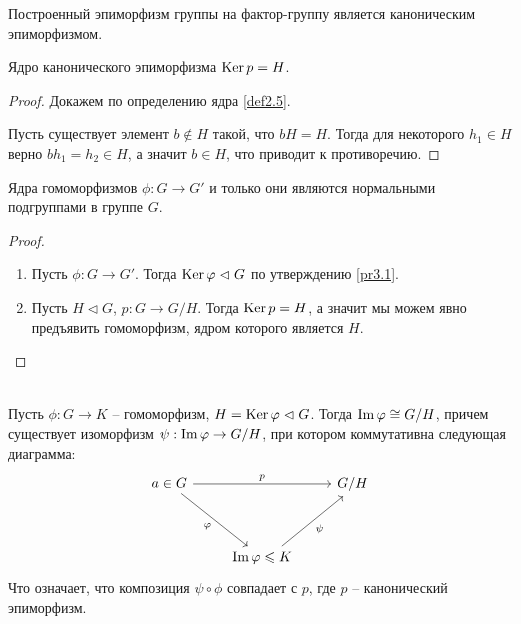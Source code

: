 \begin{definition}
    Построенный эпиморфизм группы на фактор-группу является каноническим эпиморфизмом.
\end{definition}

\begin{note}
    \label{note2.1}
    Ядро канонического эпиморфизма $\operatorname{Ker} p = H$.
\end{note}

\begin{proof}
    Докажем по определению ядра \ref{def2.5}.

    Пусть существует элемент $b \not\in H$ такой, что $bH = H$. Тогда для некоторого $h_1 \in H$ 
    верно $bh_1 = h_2 \in H$, а значит $b \in H$, что приводит к противоречию.
\end{proof}

\begin{corollary}
    Ядра гомоморфизмов $\phi: G \to G'$ и только они являются нормальными подгруппами в группе $G$.
\end{corollary}

\begin{proof}~
    \begin{enumerate}
        \item Пусть $\phi: G \to G'$. Тогда $\operatorname{Ker} \varphi \vartriangleleft G$ по утверждению \ref{pr3.1}.
        \item Пусть $H \vartriangleleft G$, $p: G \to G/H$. Тогда $\operatorname{Ker} p = H$, а значит мы можем 
        явно предъявить гомоморфизм, ядром которого является $H$.
    \end{enumerate}
\end{proof}

\begin{theorem}~ \\
    \label{th3.1}
    Пусть $\phi: G \to  K$ -- гомоморфизм, $H = \operatorname{Ker} \varphi \vartriangleleft  G$.
    Тогда $\operatorname{Im} \varphi \cong G/H$, причем существует изоморфизм $\psi: \operatorname{Im} \varphi \to G/H$, 
    при котором коммутативна следующая диаграмма:
    \[
	\begin{tikzcd}[row sep = huge]
		a \in G \arrow{rr}{p} \arrow[swap]{dr}{\phi} && G/H \\
		& \im \phi \leq K \arrow[swap, xshift = 4pt]{ur}{\psi} &
	\end{tikzcd}
	\]
    Что означает, что композиция $\psi \circ \phi$ совпадает с $p$, где $p$ -- канонический эпиморфизм.
\end{theorem}

